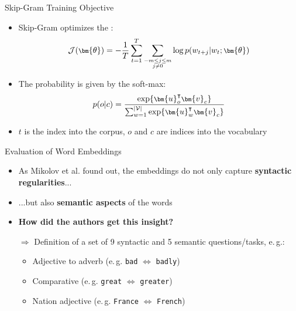 \begin{frame}{Skip-Gram Training Objective}{}
	\begin{itemize}
		\item Skip-Gram optimizes the :
		\begin{equation*}
			\footnotesize
			\mathcal{J}(\bm{\theta}) = -\frac{1}{T} \sum_{t=1}^T \sum_{\substack{-m \le j \le m\\ j \ne 0}}
				\log p(w_{t+j} \vert w_t; \bm{\theta})
		\end{equation*}
		\item The probability is given by the soft-max:
		\begin{equation*}
			\footnotesize
			p(o \vert c) = \frac{\exp\{ \bm{u}_o^{\intercal} \bm{v}_c \}}{
				\sum_{w=1}^{\vert \mathcal{V} \vert} \exp\{ \bm{u}_w^{\intercal} \bm{v}_c \}}
		\end{equation*}
		\item $t$ is the index into the corpus, $o$ and $c$ are indices into the vocabulary
	\end{itemize}
\end{frame}


\begin{frame}{Evaluation of Word Embeddings}{}
	\begin{itemize}
		\item As Mikolov et al. found out, the embeddings do not only capture \textbf{syntactic regularities}...
		\item ...but also \textbf{semantic aspects} of the words
		\item \textbf{How did the authors get this insight?}
		\item[$\bm{\Rightarrow}$] Definition of a set of 9 syntactic and 5 semantic questions/tasks, e.\,g.:
		\begin{itemize}
			\item Adjective to adverb (e.\,g. \texttt{bad} $\Leftrightarrow$ \texttt{badly})
			\item Comparative (e.\,g. \texttt{great} $\Leftrightarrow$ \texttt{greater})
			\item Nation adjective (e.\,g. \texttt{France} $\Leftrightarrow$ \texttt{French})
		\end{itemize}
	\end{itemize}
\end{frame}


